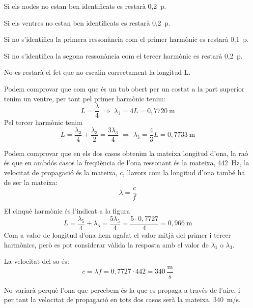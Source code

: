 \begin{solapartat}

Si els nodes no estan ben identificats es restarà 0,2~p.

Si els ventres no estan ben identificats es restarà 0,2~p.

Si no s'identifica la primera ressonància com el primer harmònic es restarà 0,1~p.

Si no s'identifica la segona ressonància com el tercer harmònic es restarà 0,2~p.

No es restarà el fet que no escalin correctament la longitud L.

 Podem comprovar que com que és un tub obert per un costat a la part superior tenim un ventre, per tant pel primer harmònic tenim:
\[ L = \frac{\lambda}{4} \;\Rightarrow\; \lambda_1 = 4L = 0,7720\ \mathrm{m} \]
Pel tercer harmònic tenim
\[ L = \frac{\lambda_3}{4} + \frac{\lambda_3}{2} = \frac{3\lambda_3}{4} \;\Rightarrow\; \lambda_3 = \frac{4}{3}L = 0,7733\ \mathrm{m} \]

 Podem comprovar que en els dos casos obtenim la mateixa longitud d'ona, la raó és que en ambdós casos la freqüència de l'ona ressonant és la mateixa, 442~Hz, la velocitat de propagació és la mateixa, $c$, llavors com la longitud d'ona també ha de ser la mateixa:
\[ \lambda = \frac{c}{f} \]


El cinquè harmònic és l'indicat a la figura
\[ L = \frac{\lambda_5}{4} + \lambda_5 = \frac{5\lambda_5}{4} = \frac{5\cdot 0,7727}{4} = 0,966\ \mathrm{m} \]
Com a valor de longitud d'ona hem agafat el valor mitjà del primer i tercer harmònics, però es pot considerar vàlida la resposta amb el valor de $\lambda_1$ o $\lambda_3$.
\end{solapartat}

\begin{solapartat}
 La velocitat del so és:
\[ c = \lambda f = 0,7727\cdot 442 = 340\ \frac{\mathrm{m}}{\mathrm{s}} \]

 No variarà perquè l'ona que percebem és la que es propaga a través de l'aire, i per tant la velocitat de propagació en tots dos casos serà la mateixa, 340~m/s.
\end{solapartat}
